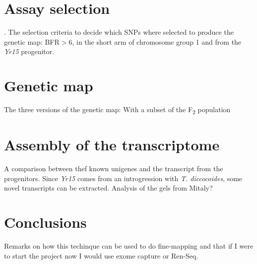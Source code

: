\section{Assay selection}. 
The selection criteria to decide which SNPs where selected to produce the genetic map: BFR$>$6, in the short arm of chromosome group 1 and from the \textit{Yr15} progenitor.

\section{Genetic map} 
The three versions of the genetic map: With a subset of the F\textsubscript{2} population

\section{Assembly of the transcriptome} 
A comparison between thef known unigenes and the transcript from the progenitors. Since \textit{Yr15} comes from an introgression with \textit{T. diccocoides}, some novel transcripts can be extracted. Analysis of the gels from Mitaly? 

\section{Conclusions} 
Remarks on how this techinque can be used to do fine-mapping and that if I were to start the project now I would  use exome capture or Ren-Seq. 
